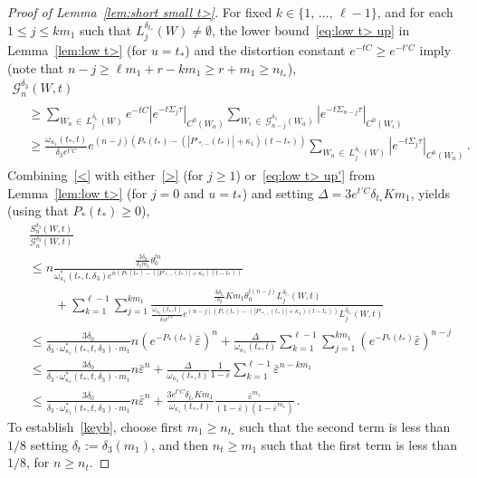 \documentclass[AHL,Unicode,longabstracts,published]{cedram}
\newcommand{\cG}{\mathcal{G}}
\newcommand{\ve}{\varepsilon}
\begin{document}
\begin{proof}[Proof of Lemma~\ref{lem:short small t>}]
For fixed $k\in \{1,\,\ldots,\,\ell-1\}$, and for each $1\le j\le km_1$ such that $L_j^{\delta_{t_*}}(W)\ne \emptyset$, the lower bound~\eqref{eq:low t> up} in Lemma~\ref{lem:low t>} (for $u=t_*$) and the distortion constant $e^{-tC}\ge e^{-t'C}$ imply (note that $n-j\ge \ell m_1+r -km_1\ge r +m_1\ge n_{t_*}$),
\begin{multline}\label{>}
\cG_n^{\delta_3}(W,t)\\
\begin{aligned}
& \ge
\sum_{W_a\,\in\,L_j^{\delta_{t_*}}(W)} e^{-tC} \left|e^{-t\Sigma_{j} \tau}\right|_{C^0(W_a)}
\sum_{W_i\,\in\,\cG_{n-j}^{\delta_3}(W_a)}\left|e^{-t\Sigma_{n-j} \tau}\right|_{C^0(W_i)}
\\
& \ge \frac{\omega_{\kappa_1}(t_*,t)}{\delta_3 e^{t'C} } e^{(n-j)\left(P_*(t_*)-\left(\left| P'_{*,-}(t_*)\right| + \kappa_1\right)(t-t_*)\right)}
\sum_{W_a\,\in\,L_j^{\delta_{t_*}}(W)} \left| e^{-t\Sigma_{j} \tau}\right|_{C^0(W_a)} \,.
\end{aligned}
\end{multline}
Combining~\eqref{<} with either~\eqref{>} (for $j\ge 1$) or~\eqref{eq:low t> up'} from Lemma~\ref{lem:low t>} (for $j=0$ and $u=t_*$) and setting $\Delta= 3 e^{t'C} \delta_{t_*} Km_1 $, yields (using that $P_*(t_*)\ge 0$),
\begingroup
\allowdisplaybreaks
\begin{align}
&\frac{ S_n^{\delta_3}(W,t)}{ \cG_n^{\delta_3}(W,t) }\label{endSSP1}\\
& \le n
\frac{ \frac{3 \delta_0 } {\delta_3 m_1}
\theta_0^{t n}}{\omega_{\kappa_1}^*(t_*, t, \delta_3) e^{n(P_*(t_*)-(| P'_{*,-}(t_*)| + \kappa_1)(t-t_*))} }\nonumber\\
 & \qquad + \sum_{k=1}^{\ell-1} \sum_{j=1}^{km_1}
\frac{ \frac{3 \delta_{t_*}}{\delta_3} { Km_1} \theta_0^{t (n - j)} L_j^{\delta_{t_*}}(W,t) } {\frac{\omega_{\kappa_1}(t_*,t)}{\delta_3 e^{t'C}} e^{(n-j)(P_*(t_*)-(| P'_{*,-}(t_*)| + \kappa_1)(t-t_*))} L_j^{\delta_{t_*}}(W,t) }\nonumber\\
 & \le
\frac{3 \delta_0 } {\delta_3 \cdot \omega_{\kappa_1}^* (t_*,t,\delta_3)\cdot m_1} n (e^{-P_*(t_*)} \bar \ve)^n + \frac{ \Delta }{\omega_{\kappa_1}(t_*,t)}\sum_{k=1}^{\ell-1} \sum_{j=1}^{km_1} \left(e^{-P_*(t_*)}\bar \ve\right)^{n-j}\nonumber\\
 & \le \frac{ 3 \delta_0 }{\delta_3 \cdot \omega_{\kappa_1}^*(t_*,t,\delta_3) \cdot m_1} n \bar \ve^n + \frac{ \Delta }{\omega_{\kappa_1}(t_*,t)}\frac 1 {1-\bar \ve} \sum_{k=1}^{\ell-1} \bar \ve^{n-km_1}\nonumber\\
 & \le \frac{ 3 \delta_0 }{\delta_3 \cdot \omega_{\kappa_1}^*(t_*, t,\delta_3) \cdot m_1}n \bar \ve^n + \frac{ 3 e^{t'C} { \delta_{t_*} Km_1 } }{\omega_{\kappa_1}(t_*,t)} \frac{\bar \ve^{m_1}}{(1-\bar \ve)(1-\bar \ve^{m_1})}\,.\nonumber
\end{align}
\endgroup
To establish~\eqref{keyb}, choose first $m_1\ge n_{t_*}$ such that the second term is less than $1/8$ setting $\delta_{t}:=\delta_3(m_1)$, and then $n_{t} \ge m_1$ such that the first term is less than $1/8$, for $n \ge n_{t}$.


\end{proof}
\end{document}
